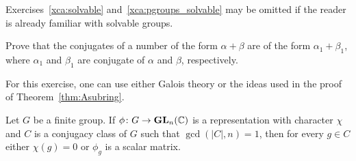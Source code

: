 Exercises~\ref{xca:solvable} and~\ref{xca:pgroups_solvable} may be omitted if the reader is already familiar with solvable groups.

\begin{exercise}
\label{xca:conjugates}
    Prove that the conjugates of 
    a number of the form $\alpha+\beta$ are of the form
    $\alpha_1+\beta_1$, where $\alpha_1$ 
    and $\beta_1$ are conjugate of $\alpha$ and $\beta$, respectively.  
\end{exercise}

For this exercise, one can use either Galois theory or the ideas used in the proof of Theorem~\ref{thm:Asubring}.

\begin{theorem}[Burnside]
	\label{thm:Burnside_auxiliar}
	Let $G$ be a finite group. If $\phi\colon G\to\mathbf{GL}_n(\mathbb{C})$ is a representation
	with character $\chi$ and $C$ is a conjugacy class of $G$ such that 
	$\gcd(|C|,n)=1$, then for every $g\in C$ either 
	$\chi(g)=0$ or $\phi_g$ is a scalar matrix. 
\end{theorem}





